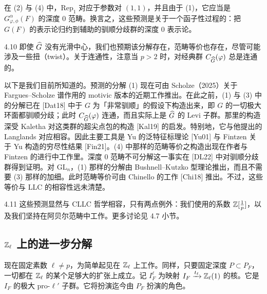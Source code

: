 在 (2) 与 (4) 中，$\mathrm{Rep}_1$ 对应于参数对 $(1,1)$，并且由于 (1)，它应当是 $G^\alpha_{\varphi,\phi}(F)$ 的深度 $0$ 范畴。换言之，这些预测是关于一个函子性过程的：把 $G(F)$ 的表示论归约到辅助的驯顺分歧群的深度 $0$ 表示论。
\begin{rem}{4.10}
即使 $\widehat{G}$ 没有光滑中心，我们也预期该分解存在，范畴等价也存在，尽管可能涉及一些扭（twist）。关于连通性，注意当 $p>2$ 时，对经典群 $C_{\widehat{G}}(\varphi)$ 总是连通的。
\end{rem}

以下是我们目前所知道的。预测的分解 (1) 现在可由 Scholze（2025）关于 Fargues–Scholze 谱作用的 motivic 版本的近期工作推出。在此之前，(1) 与 (3) 中的分解已在 [Dat18] 中于 $G$ 为「非常驯顺」的假设下构造出来，即 $G$ 的一切极大环面都驯顺分歧；此时 $C_{\widehat{G}}(\varphi)$ 连通，而且实际上是 $\widehat{G}$ 的 Levi 子群。那里的构造深受 Kaletha 对这类群的超尖点包的构造 [Kal19] 的启发。特别地，它与他提出的 Langlands 对应相容。因此主要工具是 Yu 的泛特征标理论 [Yu01] 与 Fintzen 关于 Yu 构造的穷尽性结果 [Fin21]。(4) 中那样的范畴等价之构造出现在作者与 Fintzen 的进行中工作里。深度 $0$ 范畴不可分解这一事实在 [DL22] 中对驯顺分歧群得到证明。对 $\mathrm{GL}_n$，(1) 那样的分解由 Bushnell–Kutzko 型理论推出，而且不需要 (3) 那样的加细。此时范畴等价可由 Chinello 的工作 [Chi18] 推出。不过，这些等价与 LLC 的相容性远未清楚。

\begin{rem}{4.11}
这些预测显然与 CLLC 哲学相容，只有两点例外：我们使用的系数 $\mathbb{Z}[\frac1p]$，以及我们坚持在阿贝尔范畴中工作。更多讨论见 4.7 小节。
\end{rem}

\subsection{$\mathbb{Z}_\ell$ 上的进一步分解}

现在固定素数 $\ell\neq p$，为简单起见在 $\mathbb{Z}_\ell$ 上工作。同样，只要固定深度 $P\subset P_F$，一切都在 $\mathbb{Z}_\ell$ 的某个足够大的扩张上成立。记 $I^\ell_F$ 为映射 $I_F\xrightarrow{t_\ell}\mathbb{Z}_\ell(1)$ 的核。它是 $I_F$ 的极大 pro-$\ell'$ 子群。它将扮演迄今由 $P_F$ 扮演的角色。

